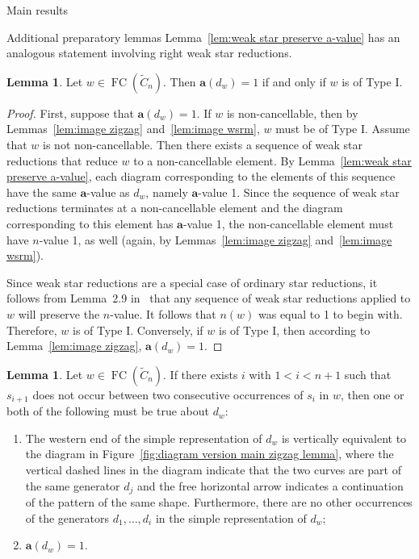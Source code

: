 \documentclass[11pt]{amsart}
\theoremstyle{definition}
\newtheorem{lemma}[theorem]{Lemma}
\numberwithin{equation}{section}
\newcommand{\C}{\widetilde{C}}
\renewcommand{\a}{\mathbf{a}}
\renewcommand{\(}{\left(}
\renewcommand{\)}{\right)}
\DeclareMathOperator{\FC}{FC}
\begin{document}
\begin{section}{Main results}
\begin{subsection}{Additional preparatory lemmas}
Lemma~\ref{lem:weak star preserve a-value} has an analogous statement involving right weak star reductions.

\begin{lemma}\label{lem:a=1 implies Type I}
Let $w \in \FC(\C_{n})$.  Then $\a(d_{w})=1$ if and only if $w$ is of Type I.
\end{lemma}

\begin{proof}
First, suppose that $\a(d_{w})=1$.  If $w$ is non-cancellable, then by Lemmas~\ref{lem:image zigzag} and~\ref{lem:image wsrm}, $w$ must be of Type I.  Assume that $w$ is not non-cancellable.  Then there exists a sequence of weak star reductions that reduce $w$ to a non-cancellable element.  By Lemma~\ref{lem:weak star preserve a-value}, each diagram corresponding to the elements of this sequence have the same $\a$-value as $d_{w}$, namely $\a$-value 1.  Since the sequence of weak star reductions terminates at a non-cancellable element and the diagram corresponding to this element has $\a$-value 1, the non-cancellable element must have $n$-value 1, as well (again, by Lemmas~\ref{lem:image zigzag} and~\ref{lem:image wsrm}).  

Since weak star reductions are a special case of ordinary star reductions, it follows from Lemma~2.9 in~\cite{Shi2005} that any sequence of weak star reductions applied to $w$ will preserve  the $n$-value.  It follows that $n(w)$ was equal to 1 to begin with.  Therefore, $w$ is of Type I.  Conversely, if $w$ is of Type I, then according to Lemma~\ref{lem:image zigzag}, $\a(d_{w})=1$.
\end{proof}

\begin{lemma}\label{lem:diagram version main zigzag lemma}
Let $w \in \FC(\C_{n})$.  If there exists $i$ with $1<i < n+1$ such that $s_{i+1}$ does not occur between two consecutive occurrences of $s_{i}$ in $w$, then one or both of the following must be true about $d_{w}$:
\begin{enumerate}[label=\rm{(\arabic*)}]
\item The western end of the simple representation of $d_{w}$ is vertically equivalent to the diagram in Figure~\ref{fig:diagram version main zigzag lemma}, where the vertical dashed lines in the diagram indicate that the two curves are part of the same generator $d_{j}$ and the free horizontal arrow indicates a continuation of the pattern of the same shape.  Furthermore, there are no other occurrences of the generators $d_{1}, \dots, d_{i}$ in the simple representation of $d_{w}$;
\item $\a(d_{w})=1$.
\end{enumerate}
\end{lemma}


\end{subsection}
\end{section}
\end{document}
